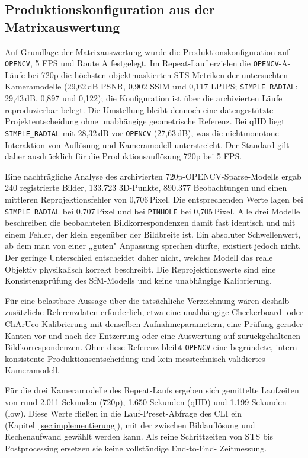\subsection{Produktionskonfiguration aus der Matrixauswertung}
\label{sec:produktionskonfiguration}

Auf Grundlage der Matrixauswertung wurde die Produktionskonfiguration auf
\texttt{OPENCV}, 5 FPS und Route A festgelegt. Im Repeat-Lauf erzielen die
\texttt{OPENCV}-A-Läufe bei 720p die höchsten objektmaskierten STS-Metriken
der untersuchten Kameramodelle (29,62\,dB PSNR, 0,902 SSIM und 0,117 LPIPS;
\texttt{SIMPLE\_RADIAL}: 29,43\,dB, 0,897 und 0,122); die
Konfiguration ist über die archivierten Läufe reproduzierbar belegt. Die
Umstellung bleibt dennoch eine datengestützte Projektentscheidung ohne
unabhängige geometrische Referenz. Bei qHD liegt \texttt{SIMPLE\_RADIAL} mit
28,32\,dB vor \texttt{OPENCV} (27,63\,dB), was die nichtmonotone Interaktion
von Auflösung und Kameramodell unterstreicht. Der Standard gilt daher
ausdrücklich für die Produktionsauflösung 720p bei 5 FPS.

Eine nachträgliche Analyse des archivierten 720p-OPENCV-Sparse-Modells ergab
240 registrierte Bilder, 133.723 3D-Punkte, 890.377 Beobachtungen und einen
mittleren Reprojektionsfehler von 0,706\,Pixel. Die entsprechenden Werte lagen
bei \texttt{SIMPLE\_RADIAL} bei 0,707\,Pixel und bei \texttt{PINHOLE} bei
0,705\,Pixel. Alle drei Modelle beschreiben die beobachteten
Bildkorrespondenzen damit fast identisch und mit einem Fehler, der klein
gegenüber der Bildbreite ist. Ein absoluter Schwellenwert, ab dem man von
einer „guten" Anpassung sprechen dürfte, existiert jedoch nicht. Der geringe
Unterschied entscheidet daher nicht, welches Modell das reale Objektiv
physikalisch korrekt beschreibt.
Die Reprojektionswerte sind eine Konsistenzprüfung des SfM-Modells und keine
unabhängige Kalibrierung.

Für eine belastbare Aussage über die tatsächliche Verzeichnung wären deshalb
zusätzliche Referenzdaten erforderlich, etwa eine unabhängige
Checkerboard- oder ChArUco-Kalibrierung mit denselben Aufnahmeparametern,
eine Prüfung gerader Kanten vor und nach der Entzerrung oder eine Auswertung
auf zurückgehaltenen Bildkorrespondenzen. Ohne diese Referenz bleibt
\texttt{OPENCV} eine begründete, intern konsistente Produktionsentscheidung
und kein messtechnisch validiertes Kameramodell.

Für die drei Kameramodelle des Repeat-Laufs ergeben sich gemittelte Laufzeiten
von rund 2.011 Sekunden (720p), 1.650 Sekunden (qHD) und 1.199 Sekunden (low).
Diese Werte fließen in die Lauf-Preset-Abfrage
des CLI ein (Kapitel~\ref{sec:implementierung}), mit der zwischen
Bildauflösung und Rechenaufwand gewählt werden kann. Als reine Schrittzeiten
von STS bis Postprocessing ersetzen sie keine vollständige End-to-End-
Zeitmessung.

